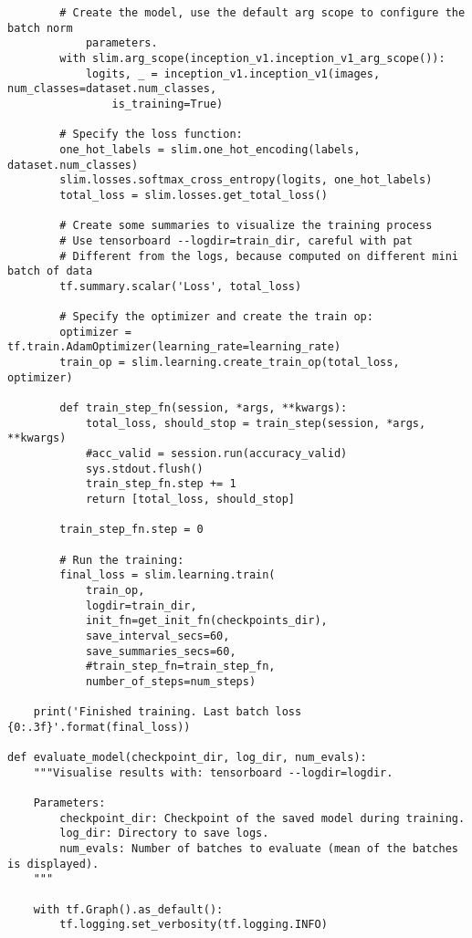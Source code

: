 \begin{lstlisting}
        # Create the model, use the default arg scope to configure the batch norm 
            parameters.
        with slim.arg_scope(inception_v1.inception_v1_arg_scope()):
            logits, _ = inception_v1.inception_v1(images, num_classes=dataset.num_classes, 
                is_training=True)
            
        # Specify the loss function:
        one_hot_labels = slim.one_hot_encoding(labels, dataset.num_classes)
        slim.losses.softmax_cross_entropy(logits, one_hot_labels)
        total_loss = slim.losses.get_total_loss()

        # Create some summaries to visualize the training process
        # Use tensorboard --logdir=train_dir, careful with pat
        # Different from the logs, because computed on different mini batch of data
        tf.summary.scalar('Loss', total_loss)
      
        # Specify the optimizer and create the train op:
        optimizer = tf.train.AdamOptimizer(learning_rate=learning_rate)
        train_op = slim.learning.create_train_op(total_loss, optimizer)

        def train_step_fn(session, *args, **kwargs):
            total_loss, should_stop = train_step(session, *args, **kwargs)
            #acc_valid = session.run(accuracy_valid)
            sys.stdout.flush()
            train_step_fn.step += 1
            return [total_loss, should_stop]
        
        train_step_fn.step = 0

        # Run the training:
        final_loss = slim.learning.train(
            train_op,
            logdir=train_dir,
            init_fn=get_init_fn(checkpoints_dir),
            save_interval_secs=60,
            save_summaries_secs=60,
            #train_step_fn=train_step_fn,
            number_of_steps=num_steps)
            
    print('Finished training. Last batch loss {0:.3f}'.format(final_loss))

def evaluate_model(checkpoint_dir, log_dir, num_evals):
    """Visualise results with: tensorboard --logdir=logdir.
    
    Parameters:
        checkpoint_dir: Checkpoint of the saved model during training.
        log_dir: Directory to save logs.
        num_evals: Number of batches to evaluate (mean of the batches is displayed).
    """
    
    with tf.Graph().as_default():
        tf.logging.set_verbosity(tf.logging.INFO)


\end{lstlisting}
